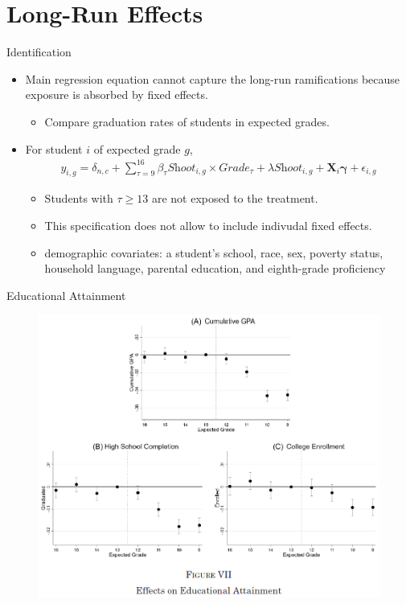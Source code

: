 \documentclass[dvipdfmx]{beamer}
\begin{document}
\section{Long-Run Effects}
\frame{\sectionpage}

\begin{frame}{Identification}
  \begin{itemize}
    \item Main regression equation cannot capture the long-run ramifications because exposure is absorbed by fixed effects.
    \begin{itemize}
      \item Compare graduation rates of students in expected grades.
    \end{itemize}
    \item For student $i$ of expected grade $g$,
    \begin{align*}
      y_{i, g} = \delta_{n, c} + \sum_{\tau = 9}^{16} \beta_{\tau} \textit{Shoot}_{i, g} \times \textit{Grade}_{\tau} + \lambda \textit{Shoot}_{i, g} + \mathbf{X}_i \boldsymbol{\gamma} + \epsilon_{i, g}
    \end{align*}
    \begin{itemize}
      \item Students with $\tau \geq 13$ are not exposed to the treatment.
      \item This specification does not allow to include indivudal fixed effects.
      \item demographic covariates: a student's school, race, sex, poverty status, household language, parental education, and eighth-grade proficiency
    \end{itemize}
  \end{itemize}
\end{frame}

\begin{frame}{Educational Attainment}
  \begin{figure}
    \centering
    \includegraphics[scale = .5]{fig_tab/os20220113/F7}
  \end{figure}
\end{frame}
\end{document}
